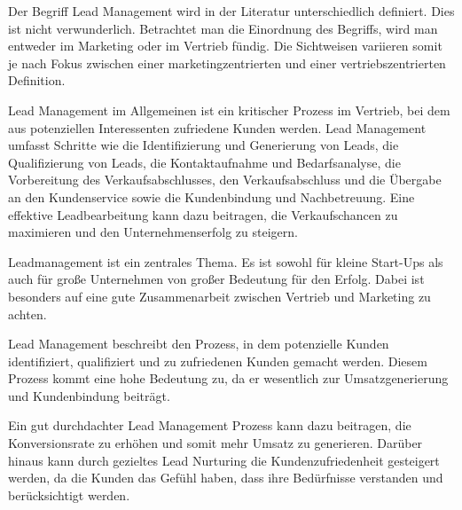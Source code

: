 
\begin{refsection}
Der Begriff Lead Management wird in der Literatur unterschiedlich definiert. Dies ist nicht verwunderlich. Betrachtet man die Einordnung des Begriffs, wird man entweder im Marketing oder im Vertrieb fündig. Die Sichtweisen variieren somit je nach Fokus zwischen einer marketingzentrierten und einer vertriebszentrierten Definition. \autocite[301]{Wenger2021}

Lead Management im Allgemeinen ist ein kritischer Prozess im Vertrieb, bei dem aus potenziellen Interessenten zufriedene Kunden werden. Lead Management umfasst Schritte wie die Identifizierung und Generierung von Leads, die Qualifizierung von Leads, die Kontaktaufnahme und Bedarfsanalyse, die Vorbereitung des Verkaufsabschlusses, den Verkaufsabschluss und die Übergabe an den Kundenservice sowie die Kundenbindung und Nachbetreuung. Eine effektive Leadbearbeitung kann dazu beitragen, die Verkaufschancen zu maximieren und den Unternehmenserfolg zu steigern.

Leadmanagement ist ein zentrales Thema. Es ist sowohl für kleine Start-Ups als auch für gro\ss{}e Unternehmen von gro\ss{}er Bedeutung für den Erfolg. Dabei ist besonders auf eine gute Zusammenarbeit zwischen Vertrieb und Marketing zu achten.

Lead Management beschreibt den Prozess, in dem potenzielle Kunden identifiziert, qualifiziert und zu zufriedenen Kunden gemacht werden. Diesem Prozess kommt eine hohe Bedeutung zu, da er wesentlich zur Umsatzgenerierung und Kundenbindung beiträgt.

Ein gut durchdachter Lead Management Prozess kann dazu beitragen, die Konversionsrate zu erhöhen und somit mehr Umsatz zu generieren. Darüber hinaus kann durch gezieltes Lead Nurturing die Kundenzufriedenheit gesteigert werden, da die Kunden das Gefühl haben, dass ihre Bedürfnisse verstanden und berücksichtigt werden.
  \clearpage
  \printbibliography[heading=subsubbibliography]
\end{refsection}
\clearpage
